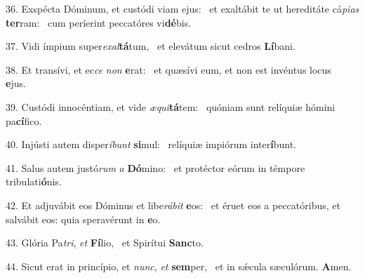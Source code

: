 36. Exspécta Dóminum, et custódi viam ejus: \dag\  et exaltábit te ut hereditáte cá\textit{pi}\textit{as} \textbf{ter}ram: \ast\  cum períerint peccatóres vi\textbf{dé}bis.\

37. Vidi ímpium super\textit{ex}\textit{al}\textbf{tá}tum, \ast\  et elevátum sicut cedros \textbf{Lí}bani.\

38. Et transívi, et ec\textit{ce} \textit{non} \textbf{e}rat: \ast\  et quæsívi eum, et non est invéntus locus \textbf{e}jus.\

39. Custódi innocéntiam, et vide \textit{æ}\textit{qui}\textbf{tá}tem: \ast\  quóniam sunt relíquiæ hómini pa\textbf{cí}fico.\

40. Injústi autem disper\textit{í}\textit{bunt} \textbf{si}mul: \ast\  relíquiæ impiórum inter\textbf{í}bunt.\

41. Salus autem justó\textit{rum} \textit{a} \textbf{Dó}mino: \ast\  et protéctor eórum in témpore tribulati\textbf{ó}nis.\

42. Et adjuvábit eos Dóminus et libe\textit{rá}\textit{bit} \textbf{e}os: \ast\  et éruet eos a peccatóribus, et salvábit eos: quia speravérunt in \textbf{e}o.\

43. Glória Pa\textit{tri}, \textit{et} \textbf{Fí}lio, \ast\  et Spirítui \textbf{Sanc}to.\

44. Sicut erat in princípio, et \textit{nunc}, \textit{et} \textbf{sem}per, \ast\  et in sǽcula sæculórum. \textbf{A}men.\

